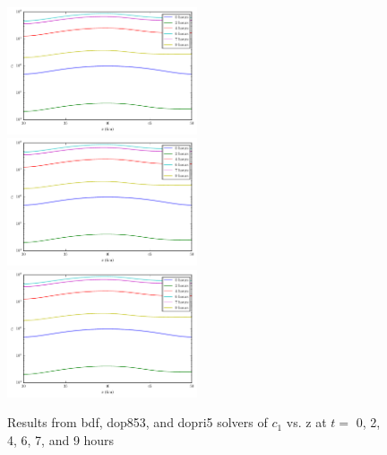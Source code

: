 \documentclass[twocolumn,10pt]{asme2ej}
\begin{document}
\begin{figure}[thb]
\begin{center}
\includegraphics[width=0.5\textwidth]{figure/bdf c1.pdf}
\includegraphics[width=0.5\textwidth]{figure/dop853 c1.pdf}
\includegraphics[width=0.5\textwidth]{figure/dopri5 c1.pdf}
\caption{Results from bdf, dop853, and dopri5 solvers of $c_1$ vs. z at $t = $ 0, 2, 4, 6, 7, and 9 hours}
\label{c1}
\end{center}
\end{figure}
\end{document}
